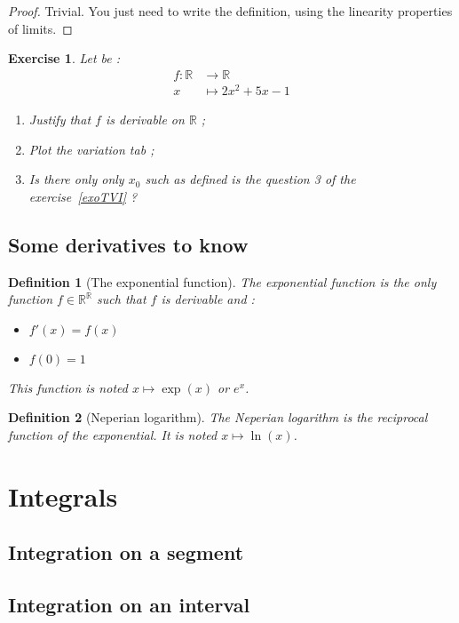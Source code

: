 \documentclass[french,12pt,a4paper]{book}
\newcommand{\R}{\mathbb{R}}
\newtheorem{exo}{Exercise}[chapter]
\newtheorem{defin}{Definition}[chapter]
\numberwithin{equation}{chapter}
\begin{document}
\begin{proof}
Trivial. You just need to write the definition, using the linearity properties of limits.
\end{proof}

\begin{exo}
\label{exoDERIV}
Let be :
\begin{align*}
f : \R &\rightarrow \R \\
x &\longmapsto 2x^2 + 5x -1
\end{align*}
\begin{enumerate}
\item Justify that $f$ is derivable on $\R$ ;
\item Plot the variation tab ;
\item Is there only only $x_0$ such as defined is the question 3 of the exercise~\ref{exoTVI} ?
\end{enumerate}
\end{exo}

\subsection{Some derivatives to know}

\begin{defin}[The exponential function]
The exponential function is the only function $f \in \R^\R$ such that $f$ is derivable and :
\begin{itemize}
\item $f'(x) = f(x)$
\item $f(0) = 1$
\end{itemize} 
This function is noted $x \longmapsto \exp (x)$ or $e^x$.
\end{defin}


\begin{defin}[Neperian logarithm]
The Neperian logarithm is the reciprocal function of the exponential. It is noted $x \longmapsto \ln (x)$.
\end{defin}

\section{Integrals}

\subsection{Integration on a segment}

\subsection{Integration on an interval}
\end{document}
